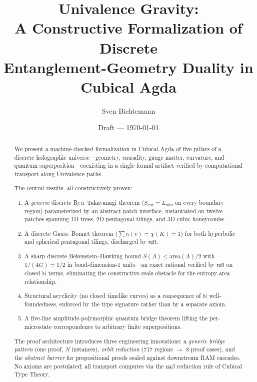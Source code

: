 \documentclass[11pt,a4paper]{article}
\title{%
  Univalence Gravity:\\[4pt]
  A Constructive Formalization of Discrete\\
  Entanglement-Geometry Duality in Cubical Agda%
}
\author{Sven Bichtemann}
\date{Draft — \today}
\newcommand{\N}{\mathbb{N}}
\newcommand{\refl}{\mathsf{refl}}
\newcommand{\ua}{\mathsf{ua}}
\newcommand{\Scut}{S_{\mathrm{cut}}}
\newcommand{\Lmin}{L_{\mathrm{min}}}
\begin{document}
\maketitle

\begin{abstract}
We present a machine-checked formalization in Cubical Agda of five
pillars of a discrete holographic universe---geometry, causality,
gauge matter, curvature, and quantum superposition---coexisting in
a single formal artifact verified by computational transport along
Univalence paths.

The central results, all constructively proven:
\begin{enumerate}[nosep]
\item A \emph{generic} discrete Ryu--Takayanagi theorem
  ($\Scut = \Lmin$ on every boundary region) parameterized by
  an abstract patch interface, instantiated on twelve patches
  spanning 1D trees, 2D pentagonal tilings, and 3D cubic
  honeycombs.
\item A discrete Gauss--Bonnet theorem
  ($\sum \kappa(v) = \chi(K) = 1$) for both hyperbolic and
  spherical pentagonal tilings, discharged by $\refl$.
\item A sharp discrete Bekenstein--Hawking bound
  $S(A) \leq \mathrm{area}(A)/2$ with $1/(4G) = 1/2$ in
  bond-dimension-1 units---an exact rational verified by
  $\refl$ on closed $\N$ terms, eliminating the
  constructive-reals obstacle for the entropy-area relationship.
\item Structural acyclicity (no closed timelike curves) as a
  consequence of $\N$ well-foundedness, enforced by the type
  signature rather than by a separate axiom.
\item A five-line amplitude-polymorphic quantum bridge theorem
  lifting the per-microstate correspondence to arbitrary finite
  superpositions.
\end{enumerate}

The proof architecture introduces three engineering innovations:
a \emph{generic bridge pattern} (one proof, $N$ instances),
\emph{orbit reduction} (717 regions $\to$ 8 proof cases), and
the \emph{abstract barrier} for propositional proofs sealed against
downstream RAM cascades.  No axioms are postulated; all transport
computes via the $\ua\beta$ reduction rule of Cubical Type Theory.
\end{abstract}

\tableofcontents
\end{document}
